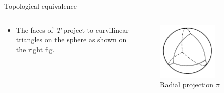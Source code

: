 \documentclass{beamer}
\begin{document}
\begin{frame}{Topological equivalence}
  \begin{columns}
    \begin{column}{0.6\textwidth}
      \begin{block}{}
        \begin{itemize}
        \item The faces of \textsl{T} project to curvilinear triangles on the sphere as shown on the right fig.
        \end{itemize}
      \end{block}
    \end{column}
    \begin{column}{0.4\textwidth}
      \begin{figure}
        \centering
        \includegraphics[width=0.7\textwidth]{figure_1_8_b.png}
        \caption{Radial projection $\pi$}
      \end{figure}
    \end{column}
  \end{columns}
\end{frame}
\end{document}

